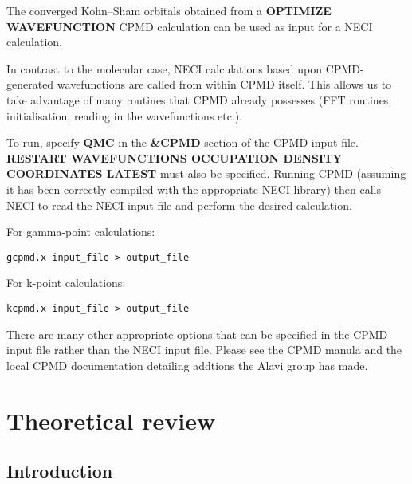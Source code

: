 \documentclass[openany,a4paper,10pt]{manual}
\begin{document}
The converged Kohn--Sham orbitals obtained from a \textbf{OPTIMIZE
WAVEFUNCTION} CPMD calculation can be used as input for a NECI
calculation.

In contrast to the molecular case, NECI calculations based upon
CPMD-generated wavefunctions are called from within CPMD itself.
This allows us to take advantage of many routines that CPMD already
possesses (FFT routines, initialisation, reading in the wavefunctions
etc.).

To run, specify \textbf{QMC} in the \textbf{\&CPMD} section of the CPMD input file.
\textbf{RESTART WAVEFUNCTIONS OCCUPATION DENSITY COORDINATES LATEST} must
also be specified.  Running CPMD (assuming it has been correctly compiled
with the appropriate NECI library) then calls NECI to read the NECI
input file and perform the desired calculation.

For gamma-point calculations:

\begin{Verbatim}[commandchars=@\[\]]
gcpmd.x input_file > output_file
\end{Verbatim}

For k-point calculations:

\begin{Verbatim}[commandchars=@\[\]]
kcpmd.x input_file > output_file
\end{Verbatim}

There are many other appropriate options that can be specified in the
CPMD input file rather than the NECI input file.  Please see the CPMD
manula and the local CPMD documentation detailing addtions the Alavi
group has made.

\resetcurrentobjects


\hypertarget{theory-index}{}\chapter{Theoretical review}

\resetcurrentobjects


\hypertarget{theory-introduction}{}\section{Introduction}
\end{document}
